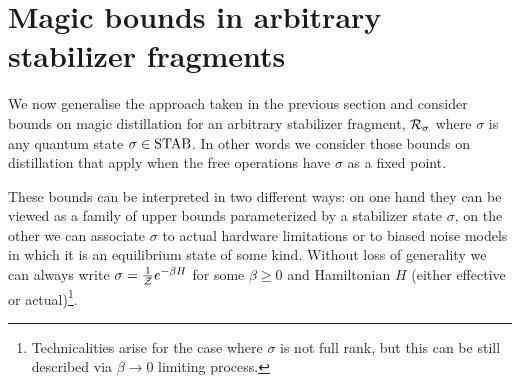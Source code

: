 \documentclass[pra,
aps,
twocolumn,
superscriptaddress,
groupedaddress,
nofootinbib,
reprint
]{revtex4-1}
\begin{document}
\newpage
\section{Magic bounds in arbitrary stabilizer fragments}\label{sec:thermal}

We now generalise the approach taken in the previous section and consider bounds on magic distillation for an arbitrary stabilizer fragment, $\mathcal{R}_\sigma$ where $\sigma$ is any quantum state $\sigma \in \rm{STAB}$. In other words we consider those bounds on distillation that apply when the free operations have $\sigma$ as a fixed point.

These bounds can be interpreted in two different ways: on one hand they can be viewed as a family of upper bounds parameterized by a stabilizer state $\sigma$, on the other we can associate $\sigma$ to actual hardware limitations or to biased noise models in which it is an equilibrium state of some kind. 
Without loss of generality we can always write $\sigma = \frac{1}{\mathcal{Z}} e^{-\beta H}$ for some $\beta \ge 0$ and Hamiltonian $H$ (either effective or actual)\footnote{Technicalities arise for the case where $\sigma$ is not full rank, but this can be still described via $ \beta \rightarrow 0$ limiting process.}.
\end{document}
